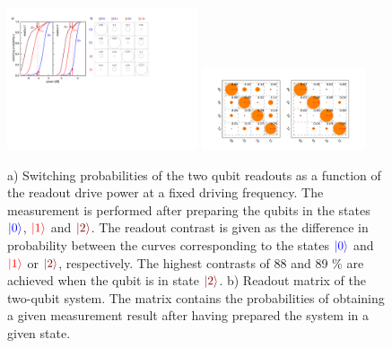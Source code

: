 \begin{figure}[ht!]
	\centering
		\includegraphics[width=0.5\textwidth]{"./material/papers/grover/figures/s curves"}
\includegraphics[width=0.43\textwidth]{"./data/ct5/2011_04_21 - grover and tomo/good_data/readout only"}
	\caption[Switching probabilities of the two qubit readouts as a function of the readout excitation power]{a) Switching probabilities of the two qubit readouts as a function of the readout drive power at a fixed driving frequency. The measurement is performed after preparing the qubits in the states $\color{blue}{\left| 0 \right>}$, $\color{red}{\left| 1 \right>}$ and $\color{brown}{\ket{2}}$. The readout contrast is given as the difference in probability between the curves corresponding to the states $\color{blue}{\left| 0 \right>}$ and $\color{red}{\left| 1 \right>}$ or $\color{brown}{\ket{2}}$, respectively. The highest contrasts of 88 and 89 \% are achieved when the qubit is in state $\color{brown}{\ket{2}}$. b) Readout matrix of the two-qubit system. The matrix contains the probabilities of obtaining a given measurement result after having prepared the system in a given state. }
	\label{fig:qubit_readout_characteristics}
\end{figure}

